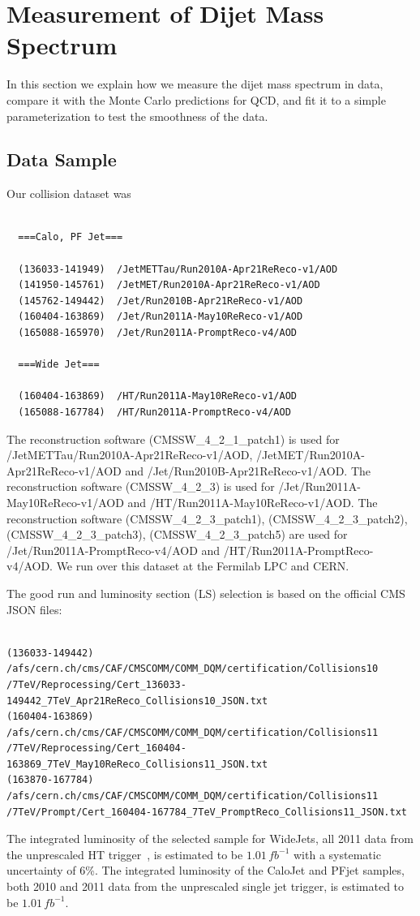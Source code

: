 \section{Measurement of Dijet Mass Spectrum}

In this section we explain how we measure the 
dijet mass spectrum in data, compare it with
the Monte Carlo predictions for QCD, and fit it
to a simple parameterization to test the smoothness 
of the data.

\subsection{Data Sample}

Our collision dataset was 
\begin{verbatim}

  ===Calo, PF Jet===
  
  (136033-141949)  /JetMETTau/Run2010A-Apr21ReReco-v1/AOD
  (141950-145761)  /JetMET/Run2010A-Apr21ReReco-v1/AOD
  (145762-149442)  /Jet/Run2010B-Apr21ReReco-v1/AOD
  (160404-163869)  /Jet/Run2011A-May10ReReco-v1/AOD
  (165088-165970)  /Jet/Run2011A-PromptReco-v4/AOD

  ===Wide Jet===

  (160404-163869)  /HT/Run2011A-May10ReReco-v1/AOD
  (165088-167784)  /HT/Run2011A-PromptReco-v4/AOD

\end{verbatim}
The reconstruction software (CMSSW\_4\_2\_1\_patch1) is used for /JetMETTau/Run2010A-Apr21ReReco-v1/AOD, /JetMET/Run2010A-Apr21ReReco-v1/AOD and /Jet/Run2010B-Apr21ReReco-v1/AOD.
The reconstruction software (CMSSW\_4\_2\_3) is used for /Jet/Run2011A-May10ReReco-v1/AOD and /HT/Run2011A-May10ReReco-v1/AOD.
The reconstruction software (CMSSW\_4\_2\_3\_patch1), (CMSSW\_4\_2\_3\_patch2), (CMSSW\_4\_2\_3\_patch3), (CMSSW\_4\_2\_3\_patch5) are used for /Jet/Run2011A-PromptReco-v4/AOD and /HT/Run2011A-PromptReco-v4/AOD.
We run over this dataset at the Fermilab LPC and CERN.

The good run and luminosity section (LS) selection is based on the official CMS JSON files:
\begin{verbatim}

(136033-149442)
/afs/cern.ch/cms/CAF/CMSCOMM/COMM_DQM/certification/Collisions10
/7TeV/Reprocessing/Cert_136033-149442_7TeV_Apr21ReReco_Collisions10_JSON.txt
(160404-163869)
/afs/cern.ch/cms/CAF/CMSCOMM/COMM_DQM/certification/Collisions11
/7TeV/Reprocessing/Cert_160404-163869_7TeV_May10ReReco_Collisions11_JSON.txt
(163870-167784)
/afs/cern.ch/cms/CAF/CMSCOMM/COMM_DQM/certification/Collisions11
/7TeV/Prompt/Cert_160404-167784_7TeV_PromptReco_Collisions11_JSON.txt

\end{verbatim}
The integrated luminosity of the selected sample for
WideJets, all 2011 data from the unprescaled HT trigger~\cite{CMS_AN_2011/242}, 
is estimated to be $1.01\,fb^{-1}$ with a systematic uncertainty of 6\%. The integrated luminosity of the
CaloJet and PFjet samples, both 2010 and 2011 data from the unprescaled single jet trigger, is estimated to be $1.01\,fb^{-1}$.

